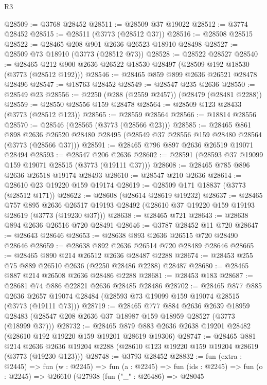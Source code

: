 \begin{lexlean}{R3}
\begin{coremodule}
@28509 := @3768 @28452
@28511 := @28509 @37 @19022
@28512 := @3774 @28452
@28515 := @28511 (@3773 (@28512 @37))
@28516 := @28508 @28515
@28522 := @28465 @208 @901 @2636 @26523 @18910 @28498
@28527 := @28509 @73 @18910 (@3773 (@28512 @73))
@28528 := @28522 @28527
@28540 := @28465 @212 @900 @2636 @26522 @18530 @28497 (@28509 @192 @18530 (@3773 (@28512 @192)))
@28546 := @28465 @859 @899 @2636 @26521 @28478 @28496
@28547 := @18763 @28452
@28549 := @28547 @235 @2636
@28550 := @28549 @23
@28556 := @2250 (@288 (@2559 @2457)) (@28479 (@28481 @2288))
@28559 := @28550 @28556 @159 @28478
@28564 := @28509 @123 @28433 (@3773 (@28512 @123))
@28565 := @28559 @28564
@28566 := @18814 @28556
@28570 := @28546 (@28565 (@3773 (@28566 @23)))
@28585 := @28465
    @861
    @898
    @2636
    @26520
    @28480
    @28495
    (@28549 @37 @28556 @159 @28480 @28564 (@3773 (@28566 @37)))
@28591 := @28465 @796 @897 @2636 @26519 @19071 @28494
@28593 := @28547 @206 @2636
@28602 := @28591 (@28593 @37 @19099 @159 @19071 @28515 (@3773 (@19111 @37)))
@28608 := @28465 @785 @896 @2636 @26518 @19174 @28493
@28610 := @28547 @210 @2636
@28614 := @28610 @23 @19220 @159 @19174
@28619 := @28509 @171 @18837 (@3773 (@28512 @171))
@28622 := @28608 (@28614 @28619 @19232)
@28637 := @28465
    @757
    @895
    @2636
    @26517
    @19193
    @28492
    (@28610 @37 @19220 @159 @19193 @28619 (@3773 (@19230 @37)))
@28638 := @28465 @721
@28643 := @28638 @894 @2636 @26516 @720 @28491
@28646 := @3787 @28452 @11 @720
@28647 := @28643 @28646
@28653 := @28638 @893 @2636 @26515 @720 @28490 @28646
@28659 := @28638 @892 @2636 @26514 @720 @28489 @28646
@28665 := @28465 @890 @214 @26512 @2636 @28487 @2288
@28674 := @28453 @255 @75 @889 @26510 @2636 (@2250 @28486 @2288) @28487
@28680 := @28465 @887 @214 @26508 @2636 @28486 @2288
@28681 := @28453 @183
@28687 := @28681 @74 @886 @22821 @2636 @28485 @28486
@28702 := @28465
    @877
    @885
    @2636
    @2657
    @19074
    @28484
    (@28593 @73 @19099 @159 @19074 @28515 (@3773 (@19111 @73)))
@28719 := @28465
    @777
    @884
    @2636
    @2639
    @18959
    @28483
    (@28547 @208 @2636 @37 @18987 @159 @18959 @28527 (@3773 (@18999 @37)))
@28732 := @28465 @879 @883 @2636 @2638 @19201 @28482 (@28610 @192 @19220 @159 @19201 @28619 @19306)
@28747 := @28465
    @881
    @214
    @2636
    @2636
    @19204
    @2288
    (@28610 @123 @19220 @159 @19204 @28619 (@3773 (@19230 @123)))
@28748 := @3793 @28452
@28832 := fun (extra : @2445) =>
  fun (w : @2245) =>
  fun (a : @2245) =>
  fun (ids : @2245) =>
  fun (o : @2245) =>
  @26610
    (@27938
      (fun ("_" : @26486) =>
      @28045

\end{coremodule}
\end{lexlean}
